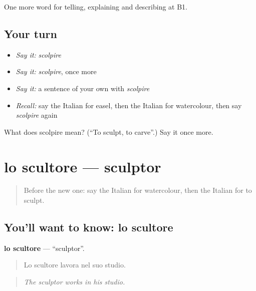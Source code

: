 \begin{grammarlens}[title={What you've built}]
One more word for telling, explaining and describing at B1.
\end{grammarlens}

\subsection*{Your turn}
\begin{itemize}
\raggedright
  \item \emph{Say it:} \emph{scolpire}
  \item \emph{Say it:} \emph{scolpire}, once more
  \item \emph{Say it:} a sentence of your own with \emph{scolpire}
  \item \emph{Recall:} say the Italian for easel, then the Italian for watercolour, then say \emph{scolpire} again
\end{itemize}

\begin{tcolorbox}[breakable,colback=teal!4,colframe=teal!35!black,title={Before you move on}]
What does scolpire mean? (\textquotedblleft{}To sculpt, to carve\textquotedblright{}.) Say it once more.
\end{tcolorbox}
\section[lo scultore]{lo scultore — sculptor}

\label{lesson:IT-C522-scultore}



\begin{quote}
Before the new one: say the Italian for watercolour, then the Italian for to sculpt.
\end{quote}

\subsection*{You'll want to know: lo scultore}
\textbf{lo scultore} — \textquotedblleft{}sculptor\textquotedblright{}.

\begin{quote}
Lo scultore lavora nel suo studio.
\end{quote}

\begin{quote}
\emph{The sculptor works in his studio.}
\end{quote}

